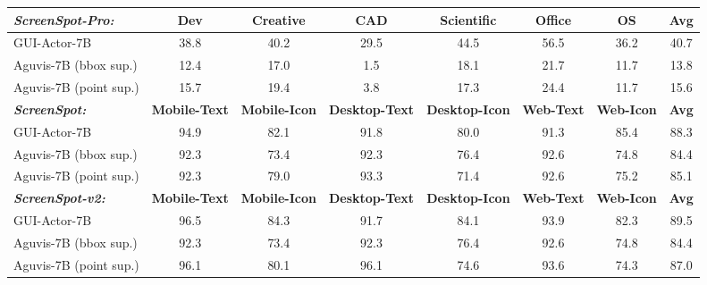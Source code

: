 \begin{table}[h]
{\begin{tabular}{lccccccc}
\toprule
\textit{\textbf{ScreenSpot-Pro:}}& \textbf{Dev} & \textbf{Creative} & \textbf{CAD} & \textbf{Scientific} & \textbf{Office} & \textbf{OS} & \textbf{Avg} \\
\midrule
GUI-Actor-7B& 38.8 & 40.2 & 29.5 & 44.5 & 56.5 & 36.2 & 40.7 \\
Aguvis-7B (bbox sup.) & 12.4 & 17.0 & 1.5 & 18.1 & 21.7 & 11.7 & 13.8\\
Aguvis-7B (point sup.) & 15.7 & 19.4 & 3.8 & 17.3 & 24.4 & 11.7 & 15.6 \\
\midrule
\textit{\textbf{ScreenSpot:}} & \textbf{Mobile-Text} & \textbf{Mobile-Icon} & \textbf{Desktop-Text} & \textbf{Desktop-Icon} & \textbf{Web-Text} & \textbf{Web-Icon} & \textbf{Avg} \\
\midrule
GUI-Actor-7B& 94.9 & 82.1 & 91.8 & 80.0& 91.3 & 85.4 & 88.3 \\
Aguvis-7B (bbox sup.) & 92.3 & 73.4 & 92.3 & 76.4 & 92.6 & 74.8 & 84.4\\
Aguvis-7B (point sup.) & 92.3 & 79.0 & 93.3 & 71.4 & 92.6 & 75.2 & 85.1\\
\midrule
\textit{\textbf{ScreenSpot-v2:}} & \textbf{Mobile-Text} & \textbf{Mobile-Icon} & \textbf{Desktop-Text} & \textbf{Desktop-Icon} & \textbf{Web-Text} & \textbf{Web-Icon} & \textbf{Avg} \\
\midrule
GUI-Actor-7B& 96.5 & 84.3 & 91.7 & 84.1 & 93.9 & 82.3 & 89.5 \\
Aguvis-7B (bbox sup.) & 92.3 & 73.4 & 92.3 & 76.4 & 92.6 & 74.8 & 84.4 \\
Aguvis-7B (point sup.) & 96.1 & 80.1 & 96.1 & 74.6 & 93.6 & 74.3 & 87.0\\
\bottomrule
\end{tabular}

\vspace{-0.5em}
}
\label{tab:ablation}
\end{table}

